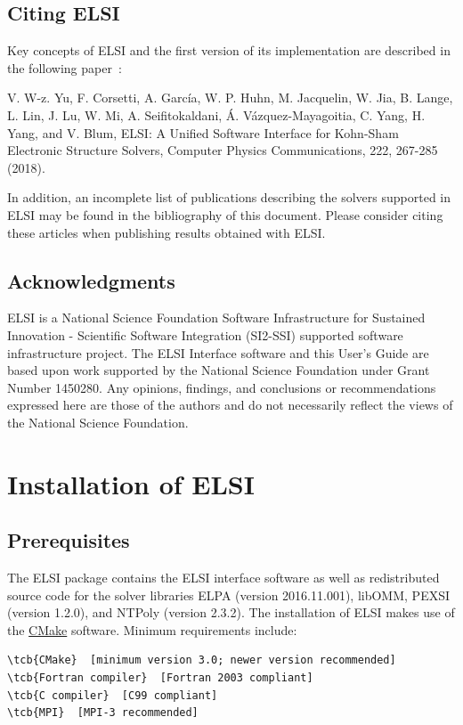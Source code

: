 \documentclass{report}
\newcommand{\tcb}[1]{\textcolor{blue}{#1}}
\begin{document}
\section{Citing ELSI}
\label{sec:cite}
Key concepts of ELSI and the first version of its implementation are described in the following paper~\cite{elsi_yu_2018}:

V. W-z. Yu, F. Corsetti, A. Garc\'{i}a, W. P. Huhn, M. Jacquelin, W. Jia, B. Lange, L. Lin, J. Lu, W. Mi, A. Seifitokaldani, \'{A}. V\'{a}zquez-Mayagoitia, C. Yang, H. Yang, and V. Blum, ELSI: A Unified Software Interface for Kohn-Sham Electronic Structure Solvers, Computer Physics Communications, 222, 267-285 (2018).

In addition, an incomplete list of publications describing the solvers supported in ELSI may be found in the bibliography of this document. Please consider citing these articles when publishing results obtained with ELSI.

\section{Acknowledgments}
\label{sec:thanks}
ELSI is a National Science Foundation Software Infrastructure for Sustained Innovation - Scientific Software Integration (SI2-SSI) supported software infrastructure project. The ELSI Interface software and this User's Guide are based upon work supported by the National Science Foundation under Grant Number 1450280. Any opinions, findings, and conclusions or recommendations expressed here are those of the authors and do not necessarily reflect the views of the National Science Foundation.

\chapter{Installation of ELSI}
\section{Prerequisites}
\label{sec:prereq}
The ELSI package contains the ELSI interface software as well as redistributed source code for the solver libraries ELPA (version 2016.11.001), libOMM, PEXSI (version 1.2.0), and NTPoly (version 2.3.2). The installation of ELSI makes use of the \href{http://cmake.org}{CMake} software. Minimum requirements include:
\begin{Verbatim}[commandchars=\\\{\}]
\tcb{CMake}  [minimum version 3.0; newer version recommended]
\tcb{Fortran compiler}  [Fortran 2003 compliant]
\tcb{C compiler}  [C99 compliant]
\tcb{MPI}  [MPI-3 recommended]
\end{Verbatim}
\end{document}
